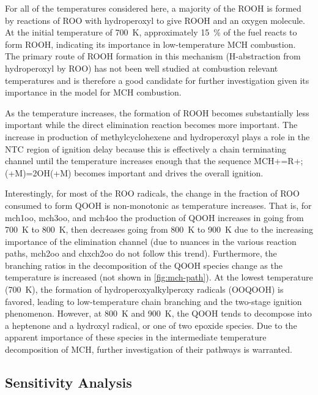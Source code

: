 \documentclass[../main.tex]{subfiles}
\begin{document}
For all of the temperatures considered here, a majority of the ROOH is formed
by reactions of ROO with hydroperoxyl to give ROOH and an oxygen molecule. At
the initial temperature of \SI{700}{\kelvin}, approximately \SI{15}{\percent} of the fuel reacts to form
ROOH, indicating its importance in low-temperature MCH combustion. The primary
route of ROOH formation in this mechanism (H-abstraction from hydroperoxyl by
ROO) has not been well studied at combustion relevant temperatures
\cite{Zador2011} and is therefore a good candidate for further investigation
given its importance in the model for MCH combustion.

As the temperature increases, the formation of ROOH becomes substantially less
important while the direct  elimination reaction becomes more important.
The increase in production of methylcyclohexene and hydroperoxyl plays a role
in the NTC region of ignition delay because this is effectively a chain
terminating channel until the temperature increases enough that the sequence
MCH+=R+; (+M)=2OH(+M) becomes important and drives
the overall ignition.

Interestingly, for most of the ROO radicals, the change in the fraction of ROO
consumed to form QOOH is non-monotonic as temperature increases. That is, for
mch1oo, mch3oo, and mch4oo the production of QOOH increases in going from \SI{700}{\kelvin}
to \SI{800}{\kelvin}, then decreases going from \SI{800}{\kelvin} to \SI{900}{\kelvin} due to the increasing
importance of the  elimination channel (due to nuances in the various
reaction paths, mch2oo and chxch2oo do not follow this trend). Furthermore,
the branching ratios in the decomposition of the QOOH species change as the
temperature is increased (not shown in \cref{fig:mch-path}). At the lowest
temperature (\SI{700}{\kelvin}), the formation of hydroperoxyalkylperoxy radicals (OOQOOH)
is favored, leading to low-temperature chain branching and the two-stage
ignition phenomenon. However, at \SI{800}{\kelvin} and \SI{900}{\kelvin}, the QOOH tends to decompose
into a heptenone and a hydroxyl radical, or one of two epoxide species. Due to
the apparent importance of these species in the intermediate temperature
decomposition of MCH, further investigation of their pathways is warranted.

\subsection{Sensitivity Analysis}
\label{sec:mch-sensitivity-analysis}
\end{document}
